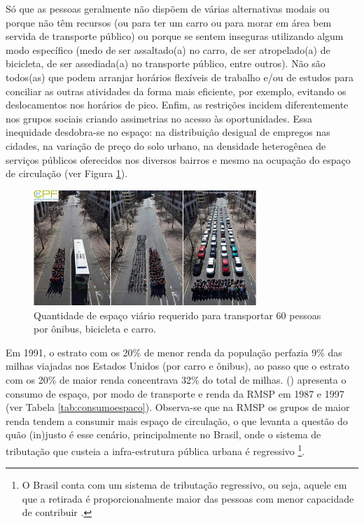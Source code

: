 Só que as pessoas geralmente não dispõem de várias alternativas modais ou porque não têm recursos (ou para ter um carro ou para morar em área bem servida de transporte público) ou porque se sentem inseguras utilizando algum modo específico (medo de ser assaltado(a) no carro, de ser atropelado(a) de bicicleta, de ser assediada(a) no transporte público, entre outros). Não são todos(as) que podem arranjar horários flexíveis de trabalho e/ou de estudos para conciliar as outras atividades da forma mais eficiente, por exemplo, evitando os deslocamentos nos horários de pico. Enfim, as restrições incidem diferentemente nos grupos sociais criando assimetrias no acesso às oportunidades. Essa inequidade desdobra-se no espaço: na distribuição desigual de empregos nas cidades, na variação de preço do solo urbano, na densidade heterogênea de serviços públicos oferecidos nos diversos bairros e mesmo na ocupação do espaço de circulação (ver Figura \ref{fig:equidade}).

\begin{figure}[htb]%
    \caption{\label{fig:equidade}Quantidade de espaço viário requerido para transportar 60 pessoas por ônibus, bicicleta e carro.}%
    \begin{center}%
        \includegraphics[width=0.75\textwidth]{./imagens/equidade-sqn.png}%
    \end{center}%
\end{figure}%

Em 1991, o estrato com os 20\% de menor renda da população perfazia 9\% das milhas viajadas nos Estados Unidos (por carro e ônibus), ao passo que o estrato com os 20\% de maior renda concentrava 32\% do total de milhas.
 (\citeyear{VASCONCELLOS2001}) apresenta o consumo de espaço, por modo de transporte e renda da RMSP em 1987 e 1997 (ver Tabela \ref{tab:consumoespaco}). Observa-se que na RMSP os grupos de maior renda tendem a consumir mais espaço de circulação, o que levanta a questão do quão (in)justo é esse cenário, principalmente no Brasil, onde o sistema de tributação que custeia a infra-estrutura pública urbana é regressivo%
\footnote{O Brasil conta com um sistema de tributação regressivo, ou seja, aquele em que a retirada é proporcionalmente maior das pessoas com menor capacidade de contribuir \cite{GRECO2005}.}.

